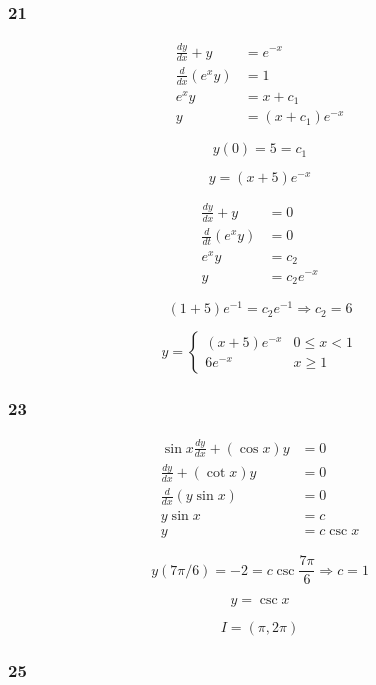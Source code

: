 \documentclass{article}
\begin{document}
\subsubsection{21}

\begin{align*}
  \frac{dy}{dx} + y    & = e^{-x}           \\
  \frac{d}{dx} (e^x y) & = 1                \\
  e^x y                & = x + c_1          \\
  y                    & = (x + c_1) e^{-x}
\end{align*}

\[y(0) = 5 = c_1\]

\[y = (x + 5) e^{-x}\]

\begin{align*}
  \frac{dy}{dx} + y    & = 0          \\
  \frac{d}{dt} (e^x y) & = 0          \\
  e^x y                & = c_2        \\
  y                    & = c_2 e^{-x}
\end{align*}

\[(1 + 5) e^{-1} = c_2 e^{-1} \Rightarrow c_2 = 6\]

\[y = \begin{cases}
    (x + 5) e^{-x} & 0 \le x < 1 \\
    6 e^{-x}       & x \ge 1
  \end{cases}\]

\subsubsection{23}

\begin{align*}
  \sin x \frac{dy}{dx} + (\cos x) y & = 0        \\
  \frac{dy}{dx} + (\cot x) y        & = 0        \\
  \frac{d}{dx} (y \sin x)           & = 0        \\
  y \sin x                          & = c        \\
  y                                 & = c \csc x
\end{align*}

\[y(7 \pi / 6) = -2 = c \csc \frac{7 \pi}{6} \Rightarrow c = 1\]

\[y = \csc x\]

\[I = (\pi, 2 \pi)\]

\subsubsection{25}
\end{document}
